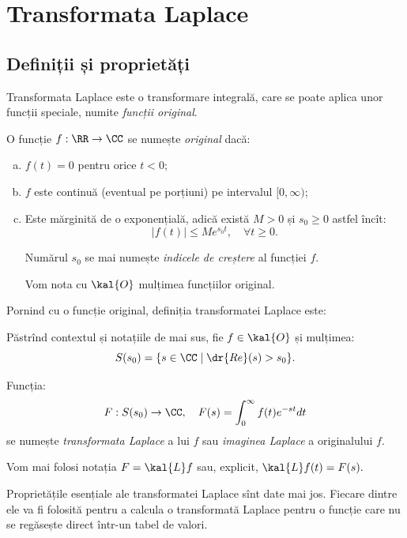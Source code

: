 
\chapter{Transformata Laplace}

\section{Definiții și proprietăți}

Transformata Laplace este o transformare integrală, care se poate aplica unor
funcții speciale, numite \emph{funcții original}.

\begin{definition}\label{def:orig}
  O funcție $ f : \RR \to \CC $ se numește \emph{original} dacă:
  \begin{enumerate}[(a)]
  \item $ f(t) = 0 $ pentru orice $ t < 0 $;
  \item $ f $ este continuă (eventual pe porțiuni) pe intervalul $ [0, \infty) $;
  \item Este mărginită de o exponențială, adică există $ M > 0 $ și $ s_0 \geq 0 $
    astfel încît:
    \[
      |f(t)| \leq Me^{s_0 t}, \quad \forall t \geq 0.
    \]

    Numărul $ s_0 $ se mai numește \emph{indicele de creștere} al
    funcției $ f $.

    Vom nota cu $ \kal{O} $ mulțimea funcțiilor original.
  \end{enumerate}
\end{definition}

Pornind cu o funcție original, definiția transformatei Laplace este:
\begin{definition}\label{def:lapl}
  Păstrînd contextul și notațiile de mai sus, fie $ f \in \kal{O} $ și
  mulțimea:
  \[
    S(s_0) = \{ s \in \CC \mid \dr{Re}(s) > s_0 \}.
  \]

  Funcția:
  \[
    F : S(s_0) \to \CC, \quad F(s) = \int_0^\infty f(t) e^{-st} dt
  \]
  se numește \emph{transformata Laplace} a lui $ f $ sau \emph{imaginea Laplace}
  a originalului $ f $.

  Vom mai folosi notația $ F = \kal{L} f $ sau, explicit, $ \kal{L} f(t) = F(s). $
\end{definition}

Proprietățile esențiale ale transformatei Laplace sînt date mai jos. Fiecare dintre ele
va fi folosită pentru a calcula o transformată Laplace pentru o funcție care nu se
regăsește direct într-un tabel de valori.

